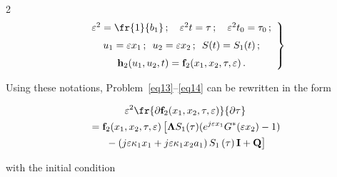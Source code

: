 \begin{multicols}{2}
\begin{equation}


\left.


\begin{array}{c}


\varepsilon^2=\fr{1}{b_1}\,;\quad


\varepsilon^2 t=\tau\,;\quad


\varepsilon^2 t_0=\tau_0\,;\\[6pt] 


u_1=\varepsilon x_1\,;\enskip 


u_2=\varepsilon x_2\,;\enskip 


S(t)=S_1(t)\,;\\[6pt] 


{\bf h}_2(u_1,u_2,t)={\bf f}_2(x_1,x_2,\tau,\varepsilon)\,.


\end{array}


\right\}


\label{eq15}


\end{equation}





Using these notations, Problem~\eqref{eq13}--\eqref{eq14} can be rewritten in the form


\begin{multline}


\varepsilon^2\fr{\partial {\bf f}_2(x_1,x_2,\tau,\varepsilon)}{\partial \tau}\\


{}=


{\bf{f}}_2(x_1,x_2,\tau,\varepsilon)\left[


\mathbf{\Lambda} S_1(\tau)(e^{j\varepsilon x_1}G^*(\varepsilon x_2)-1)\right. 


\\


\left.{} -\left( j\varepsilon\kappa_1x_1+j\varepsilon\kappa_1x_2a_1\right)


S_1\left( \tau\right) \mathbf{I}+ \mathbf{Q}


\vphantom{e^{j\varepsilon x_1}G^*(\varepsilon x_2)}


\right]


\label{eq16}


\end{multline}


with the initial condition


\begin{equation}



\end{equation}
\end{multicols}
